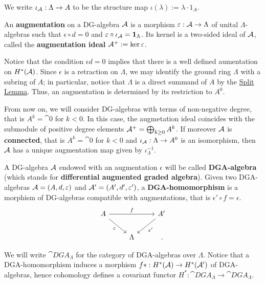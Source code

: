 	We write $\iota_{\mathcal{A}} : \Lambda \to A$ to be the structure map
	$\iota(\lambda) := \lambda \cdot 1_{A}$.
	
	\begin{df}
		An \textbf{augmentation} on a DG-algebra $\mathcal{A}$
		is a morphism $\varepsilon : \mathcal{A} \to \Lambda$
		of unital $\Lambda$-algebras such that $\epsilon \circ d = 0$ and
		$\varepsilon \circ \iota_{\mathcal{A}} = {\normalfont\textbf{1}}_{\Lambda}$.
		Its kernel is a two-sided ideal of $\mathcal{A}$,
		called the \textbf{augmentation ideal} $\mathcal{A}^{+} := \ker \varepsilon$.
	\end{df}
	
	Notice that the condition $\epsilon d = 0$ implies
	that there is a well defined aumentation on $H^*(\mathcal{A})$.
	Since $\epsilon$ is a retraction on $\Lambda$,
	we may identify the ground ring $\Lambda$ with a subring of $A$;
	in particular, notice that $\Lambda$ is a direct summand of $A$
	by the \hyperref[split-lemma]{Split Lemma}.
	Thus, an augmentation is determined by its restriction to $A^{0}$.
	
	From now on, we will consider DG-algebras with terms of non-negative degree,
	that is $A^{k} = \cat{0}$ for $k<0$. In this case,
	the augmetation ideal coincides with the
	submodule of positive degree elements
	$\mathcal{A}^{+} = \bigoplus_{k \ge 0} A^{k}$.
	If moreover $\mathcal{A}$ is \textbf{connected},
	that is $A^{k} = \cat{0}$ for $k<0$ and $\iota_{\mathcal{A}}:\Lambda \to A^{0}$
	is an isomorphism, then $\mathcal{A}$ has a unique augmentation map
	given by $\iota_{\Lambda}^{-1}$.
	

	
	
	\begin{df}
		A DG-algebra $\mathcal{A}$ endowed with an augmentation $\epsilon$
		will be called \textbf{DGA-algebra} 
		(which stands for \textbf{differential augmented graded algebra}).
		Given two DGA-algebras 
		$\mathcal{A} = (A,d,\varepsilon)$ and $\mathcal{A}' = (A',d',\varepsilon')$,
		a \textbf{DGA-homomorphism} is a morphism
		of DG-algebras compatible with augmentations,
		that is $\epsilon' \circ f = \epsilon$.
		\begin{equation*}
			\begin{tikzcd}
				A \ar[rr, "f"] \ar[dr, "\epsilon"'] & & A' \ar[dl, "\epsilon'"] \\
				& \Lambda & \,.
			\end{tikzcd}
		\end{equation*}
	\end{df}
	
	We will write $\cat{DGA}_{\Lambda}$ for the category of
	DGA-algebras over $\Lambda$.
	Notice that a DGA-homomorphism induces a morphism $f*:H^*(\mathcal{A}) \to H^*(\mathcal{A}')$
	of DGA-algebras, hence cohomology defines a covariant functor
	$H^*:\cat{DGA}_{\Lambda} \to \cat{DGA}_{\Lambda}$.
	
